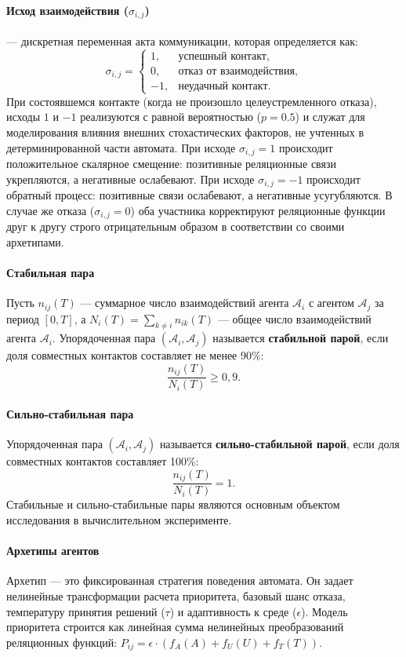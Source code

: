 \documentclass[12pt]{article}
\begin{document}
\paragraph{Исход взаимодействия (\(\sigma_{i,j}\))} — дискретная переменная акта коммуникации, которая определяется как:
\[
\sigma_{i,j} = \begin{cases} 
1, & \text{успешный контакт,} \\
0, & \text{отказ от взаимодействия,} \\
-1, & \text{неудачный контакт.}
\end{cases}
\]
При состоявшемся контакте (когда не произошло целеустремленного отказа), исходы \(1\) и \(-1\) реализуются с равной вероятностью (\(p=0.5\)) и служат для моделирования влияния внешних стохастических факторов, не учтенных в детерминированной части автомата. При исходе \(\sigma_{i,j} = 1\) происходит положительное скалярное смещение: позитивные реляционные связи укрепляются, а негативные ослабевают. При исходе \(\sigma_{i,j} = -1\) происходит обратный процесс: позитивные связи ослабевают, а негативные усугубляются. В случае же отказа (\(\sigma_{i,j} = 0\)) оба участника корректируют реляционные функции друг к другу строго отрицательным образом в соответствии со своими архетипами.

\paragraph{Стабильная пара}
Пусть $n_{ij}(T)$ — суммарное число взаимодействий агента $\mathcal{A}_i$ с агентом $\mathcal{A}_j$ за период $[0, T]$, а $N_i(T) = \sum_{k \neq i} n_{ik}(T)$ — общее число взаимодействий агента $\mathcal{A}_i$. Упорядоченная пара $(\mathcal{A}_i, \mathcal{A}_j)$ называется \textbf{стабильной парой}, если доля совместных контактов составляет не менее 90\%:
\[
\frac{n_{ij}(T)}{N_i(T)} \geq 0{,}9.
\]

\paragraph{Сильно-стабильная пара}
Упорядоченная пара $(\mathcal{A}_i, \mathcal{A}_j)$ называется \textbf{сильно-стабильной парой}, если доля совместных контактов составляет 100\%:
\[
\frac{n_{ij}(T)}{N_i(T)} = 1.
\]
Стабильные и сильно-стабильные пары являются основным объектом исследования в вычислительном эксперименте.

\paragraph{Архетипы агентов}
Архетип — это фиксированная стратегия поведения автомата. Он задает нелинейные трансформации расчета приоритета, базовый шанс отказа, температуру принятия решений (\(\tau\)) и адаптивность к среде (\(\epsilon\)). Модель приоритета строится как линейная сумма нелинейных преобразований реляционных функций: \(P_{ij} = \epsilon \cdot (f_A(A) + f_U(U) + f_T(T))\).
\end{document}

